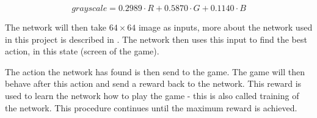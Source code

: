 \begin{equation}
grayscale = 0.2989 \cdot R + 0.5870 \cdot G + 0.1140 \cdot B 
\end{equation}  

The network will then take $64 \times 64 $ image as inputs, more about the network used in this project is described in . The network then uses this input to find the best action, in this state (screen of the game). 

The action the network has found is then send to the game. The game will then behave after this action and send a reward back to the network. This reward is used to learn the network how to play the game - this is also called training of the network. This procedure continues until the maximum reward is achieved.   


 

 
   